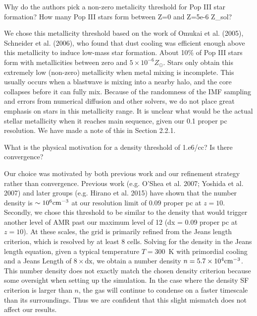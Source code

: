 \documentclass[11pt]{article}
\newenvironment{referee}[1][]{%
    \ignorespaces%
    \begin{mdframed}[style=myquotestyle,#1]%
}{%
    \end{mdframed}%
    \ignorespacesafterend%
}%
\begin{document}
\begin{referee}
Why do the authors pick a non-zero metalicity threshold for Pop III star formation? How many Pop III stars form between Z=0 and Z=5e-6 Z\_sol?
\end{referee}

We chose this metallicity threshold based on the work of Omukai et al. (2005), Schneider et al. (2006), who found that dust cooling was efficient enough above this metallicity to induce low-mass star formation. About 10\% of Pop III stars form with metallicities between zero and $5 \times 10^{-6} Z_\odot$.  Stars only obtain this extremely low (non-zero) metallicity when metal mixing is incomplete.  This usually occurs when a blastwave is mixing into a nearby halo, and the core collapses before it can fully mix.  Because of the randomness of the IMF sampling and errors from numerical diffusion and other solvers, we do not place great emphasis on stars in this metallicity range.  It is unclear what would be the actual stellar metallicity when it reaches main sequence, given our 0.1 proper pc resolution.  We have made a note of this in Section 2.2.1.

\begin{referee}
What is the physical motivation for a density threshold of 1.e6/cc? Is there convergence?
\end{referee}

Our choice was motivated by both previous work and our refinement strategy rather than convergence. Previous work (e.g. O'Shea et al. 2007; Yoshida et al. 2007) and later groups (e.g. Hirano et al. 2015) have shown that the number density is $\sim 10^6 \cubecm$ at our resolution limit of $0.09$ proper pc at $z=10$.  Secondly, we chose this threshold to be similar to the density that would trigger another level of AMR past our maximum level of 12 (dx = 0.09 proper pc at $z=10$).  At these scales, the grid is primarily refined from the Jeans length criterion, which is resolved by at least 8 cells.  Solving for the density in the Jeans length equation, given a typical temperature $T=300$~K with primordial cooling and a Jeans Length of $8 \times \textrm{dx}$, we obtain a number density $n = 5.7 \times 10^4 \cubecm$.  This number density does not exactly match the chosen density criterion because some oversight when setting up the simulation.  In the case where the density SF criterion is larger than $n$, the gas will continue to condense on a faster timescale than its surroundings.  Thus we are confident that this slight mismatch does not affect our results.
\end{document}
